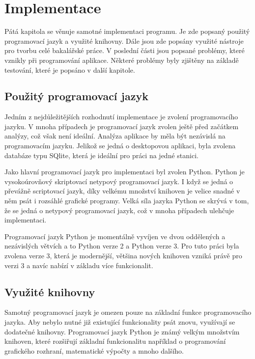 \documentclass[thesis=B,czech]{resources/FITthesis}[2012/06/26]
\begin{document}
\chapter{Implementace}
Pátá kapitola se věnuje samotné implementaci programu. Je zde popsaný použitý programovací jazyk a využité knihovny.  Dále jsou zde popsány využité nástroje pro tvorbu celé bakalářské práce. V poslední části jsou popsané problémy, které vznikly při programování aplikace. Některé problémy byly zjištěny na základě testování, které je popsáno v další kapitole.

\section{Použitý programovací jazyk}
\label{programovaci_jazyk}
Jedním z nejdůležitějších rozhodnutí implementace je zvolení programovacího jazyku. V mnoha případech je programovací jazyk zvolen ještě před začátkem analýzy, což však není ideální. Analýza aplikace by měla být nezávislá na programovacím jazyku. Jelikož se jedná o desktopovou aplikaci, byla zvolena databáze typu SQlite, která je ideální pro práci na jedné stanici. \par

Jako hlavní programovací jazyk pro implementaci byl zvolen Python\cite{python3}. Python je vysokoúrovňový skriptovací netypový programovací jazyk. I když se jedná o převážně scriptovací jazyk, díky velkému množství knihoven je velice snadné v něm psát i rozsáhlé grafické programy. Velká síla jazyka Python se skrývá v tom, že se jedná o netypový programovací jazyk, což v mnoha případech ulehčuje implementaci. \par

Programovací jazyk Python je momentálně vyvíjen ve dvou oddělených a nezávislých větvích a to Python verze 2 a Python verze 3. Pro tuto práci byla zvolena verze 3, která je modernější, většina nových knihoven vzniká právě pro verzi 3 a navíc nabízí v základu více funkcionalit.

\section{Využité knihovny}
Samotný programovací jazyk je omezen pouze na základní funkce programovacího jazyka. Aby nebylo nutné již existující funkcionality psát znovu, využívají se dodatečné knihovny. Programovací jazyk Python je známý velkým množstvím knihoven, které rozšiřují základní funkcionalitu například o programování grafického rozhraní, matematické výpočty a mnoho dalšího. 
\end{document}
